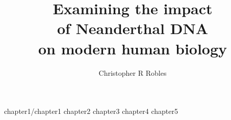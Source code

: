 \documentclass [PhD] {uclathes}
\title          {Examining the impact \\
                of Neanderthal DNA \\
                on modern human biology}
\author         {Christopher R Robles}
\begin{document}
\makeintropages

%
%
 {chapter1/chapter1}                         %
 {chapter2}                         %
 {chapter3}                         %
 {chapter4}
 {chapter5}



\end{document}
